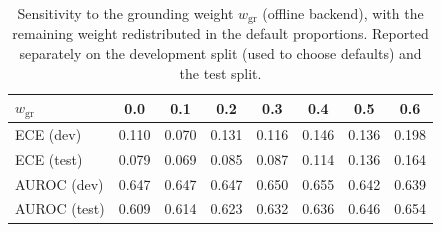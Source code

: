\begin{table}[t]
  \caption{Sensitivity to the grounding weight $w_{\mathrm{gr}}$ (offline backend), with the remaining weight redistributed in the default proportions. Reported separately on the development split (used to choose defaults) and the test split.}
  \label{tab:sweep-offline}
  \footnotesize
  \setlength{\tabcolsep}{3pt}
  \begin{tabular}{lccccccc}
    \toprule
    $w_{\mathrm{gr}}$ & 0.0 & 0.1 & 0.2 & 0.3 & 0.4 & 0.5 & 0.6 \\
    \midrule
    ECE (dev) & 0.110 & 0.070 & 0.131 & 0.116 & 0.146 & 0.136 & 0.198 \\
    ECE (test) & 0.079 & 0.069 & 0.085 & 0.087 & 0.114 & 0.136 & 0.164 \\
    AUROC (dev) & 0.647 & 0.647 & 0.647 & 0.650 & 0.655 & 0.642 & 0.639 \\
    AUROC (test) & 0.609 & 0.614 & 0.623 & 0.632 & 0.636 & 0.646 & 0.654 \\
    \bottomrule
  \end{tabular}
\end{table}
